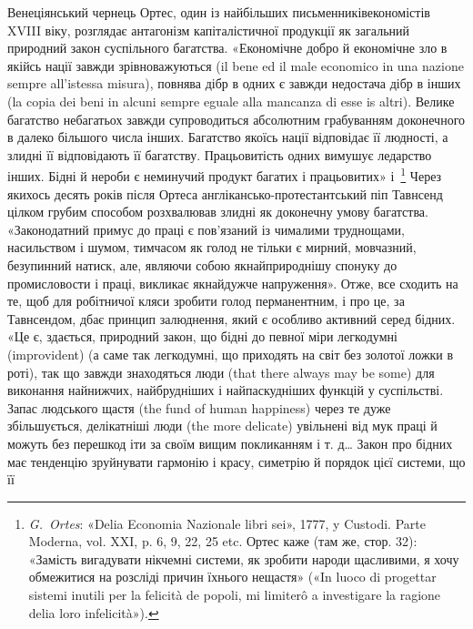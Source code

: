 Венеціянський чернець Ортес, один із найбільших письменників\dash{}економістів
XVIII віку, розглядає антагонізм капіталістичної
продукції як загальний природний закон суспільного
багатства. «Економічне добро й економічне зло в якійсь нації
завжди зрівноважуються (il bene ed il male economico in una
nazione sempre all’istessa misura), повнява дібр в одних є завжди
недостача дібр в інших (la copia dei beni in alcuni sempre eguale
alla mancanza di esse is altri). Велике багатство небагатьох завжди
супроводиться абсолютним грабуванням доконечного в далеко
більшого числа інших. Багатство якоїсь нації відповідає її людності,
а злидні її відповідають її багатству. Працьовитість одних
вимушує ледарство інших. Бідні й нероби є неминучий продукт
багатих і працьовитих» і~\footnote{
\emph{G.~Ortes}: «Delia Economia Nazionale libri sei», 1777, y Custodi.
Parte Moderna, vol. XXI, p. 6, 9, 22, 25 etc. Ортес каже (там же, стор. 32):
«Замість вигадувати нікчемні системи, як зробити народи щасливими,
я хочу обмежитися на розсліді причин їхнього нещастя» («In luoco di
progettar sistemi inutili per la felicità de popoli, mi limiterô a investigare
la ragione delia loro infelicità»).
} Через якихось десять років
після Ортеса англікансько-протестантський піп Тавнсенд цілком
грубим способом розхвалював злидні як доконечну умову
багатства. «Законодатний примус до праці є пов’язаний із чималими
труднощами, насильством і шумом, тимчасом як голод не
тільки є мирний, мовчазний, безупинний натиск, але, являючи
собою якнайприроднішу спонуку до промисловости і праці, викликає
якнайдужче напруження». Отже, все сходить на те, щоб
для робітничої кляси зробити голод перманентним, і про це, за
Тавнсендом, дбає принцип залюднення, який є особливо активний
серед бідних. «Це є, здається, природний закон, що бідні
до певної міри легкодумні (improvident) (а саме так легкодумні,
що приходять на світ без золотої ложки в роті), так що завжди
знаходяться люди (that there always may be some) для виконання
найнижчих, найбрудніших і найпаскудніших функцій у суспільстві.
Запас людського щастя (the fund of human happiness) через
те дуже збільшується, делікатніші люди (the more delicate) увільнені
від мук праці й можуть без перешкод іти за своїм вищим
покликанням і т. д\dots{} Закон про бідних має тенденцію зруйнувати
гармонію і красу, симетрію й порядок цієї системи, що її
\parbreak{}  %
